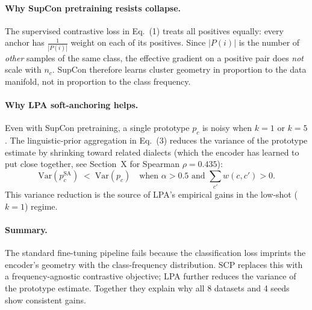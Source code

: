 \paragraph{Why SupCon pretraining resists collapse.}
The supervised contrastive loss in Eq.~(1) treats all positives
equally: every anchor has $\frac{1}{|P(i)|}$ weight on each of
its positives. Since $|P(i)|$ is the number of \emph{other}
samples of the same class, the effective gradient on a positive
pair does \emph{not} scale with $n_c$. SupCon therefore learns
cluster geometry in proportion to the data manifold, not in
proportion to the class frequency.

\paragraph{Why LPA soft-anchoring helps.}
Even with SupCon pretraining, a single prototype $p_c$ is noisy
when $k{=}1$ or $k{=}5$. The linguistic-prior aggregation in
Eq.~(3) reduces the variance of the prototype estimate by
shrinking toward related dialects (which the encoder has learned
to put close together, see Section~X for Spearman $\rho{=}0.435$):
\begin{equation}
\mathrm{Var}(p_c^{\text{SA}}) \;<\; \mathrm{Var}(p_c) \quad\text{when } \alpha > 0.5 \text{ and } \sum_{c'} w(c,c') > 0.
\end{equation}
This variance reduction is the source of LPA's empirical gains
in the low-shot ($k{=}1$) regime.

\paragraph{Summary.}
The standard fine-tuning pipeline fails because the
classification loss imprints the encoder's geometry with the
class-frequency distribution. SCP replaces this with a
frequency-agnostic contrastive objective; LPA further reduces
the variance of the prototype estimate. Together they explain
why all 8 datasets and 4 seeds show consistent gains.

%
